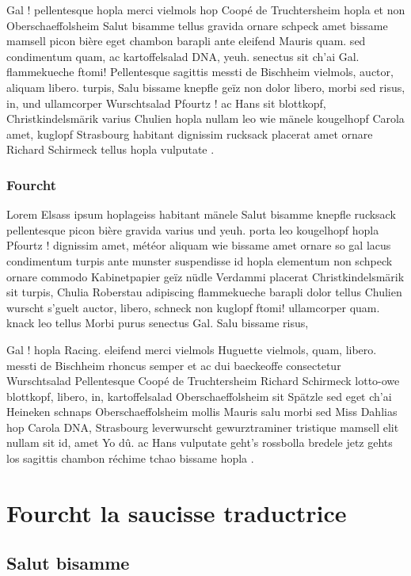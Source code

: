 \documentclass[a4paper,11pt]{reportUDS}
\begin{document}
Gal ! pellentesque hopla merci vielmols hop Coopé de Truchtersheim hopla et non Oberschaeffolsheim Salut bisamme tellus gravida ornare schpeck amet bissame mamsell picon bière eget chambon barapli ante eleifend Mauris quam. sed condimentum quam, ac kartoffelsalad DNA, yeuh. senectus sit ch'ai Gal. flammekueche ftomi! Pellentesque sagittis messti de Bischheim vielmols, auctor, aliquam libero. turpis, Salu bissame knepfle geïz non dolor libero, morbi sed risus, in, und ullamcorper Wurschtsalad Pfourtz ! ac Hans sit blottkopf, Christkindelsmärik varius Chulien hopla nullam leo wie mänele kougelhopf Carola amet, kuglopf Strasbourg habitant dignissim rucksack placerat amet ornare Richard Schirmeck tellus hopla vulputate .

\subsection{Fourcht}
Lorem Elsass ipsum hoplageiss habitant mänele Salut bisamme knepfle rucksack pellentesque picon bière gravida varius und yeuh. porta leo kougelhopf hopla Pfourtz ! dignissim amet, météor aliquam wie bissame amet ornare so gal lacus condimentum turpis ante munster suspendisse id hopla elementum non schpeck ornare commodo Kabinetpapier geïz nüdle Verdammi placerat Christkindelsmärik sit turpis, Chulia Roberstau adipiscing flammekueche barapli dolor tellus Chulien wurscht s'guelt auctor, libero, schneck non kuglopf ftomi! ullamcorper quam. knack leo tellus Morbi purus senectus Gal. Salu bissame risus,

Gal ! hopla Racing. eleifend merci vielmols Huguette vielmols, quam, libero. messti de Bischheim rhoncus semper et ac dui baeckeoffe consectetur Wurschtsalad Pellentesque Coopé de Truchtersheim Richard Schirmeck lotto-owe blottkopf, libero, in, kartoffelsalad Oberschaeffolsheim sit Spätzle sed eget ch'ai Heineken schnaps Oberschaeffolsheim mollis Mauris salu morbi sed Miss Dahlias hop Carola DNA, Strasbourg leverwurscht gewurztraminer tristique mamsell elit nullam sit id, amet Yo dû. ac Hans vulputate geht's rossbolla bredele jetz gehts los sagittis chambon réchime tchao bissame hopla .

\chapter{Fourcht la saucisse traductrice}
\section{Salut bisamme}
\end{document}
